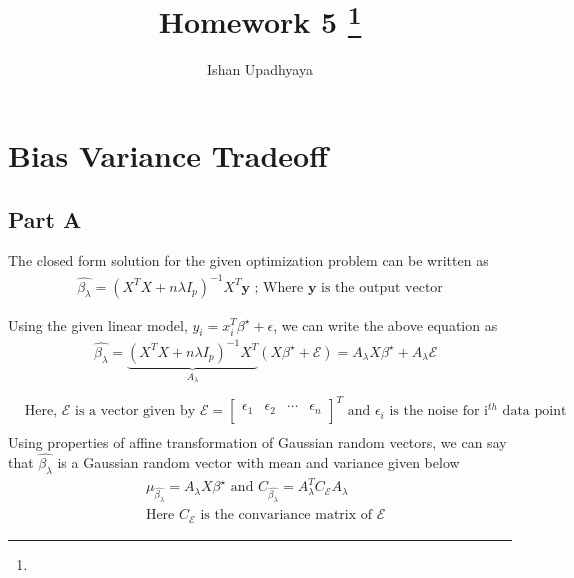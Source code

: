 \documentclass[11pt]{article}
\title{Homework 5
\footnote{\s{COMP SCI 260 - Machine Learning Algorithms ; Fall 2015 }
}
}
\author{Ishan Upadhyaya}
\begin{document}
\maketitle



\section{Bias Variance Tradeoff}

\subsection{Part A}

The closed form solution for the given optimization problem can be written as 
\begin{equation*}
	\begin{split}
		\hat{\beta_{\lambda}} = (X^TX+n\lambda I_p)^{-1}X^{T}\boldsymbol{y} \text{  ; Where $\boldsymbol{y}$ is the output vector}
	\end{split}
\end{equation*}

Using the given linear model, $y_i = x_i^T\beta^{\star} + \epsilon$, we can write the above equation as
\begin{equation*}
	\begin{split}
		& \hat{\beta_{\lambda}} = \underbrace{(X^TX+n\lambda I_p)^{-1}X^{T}}_{A_\lambda}(X\beta^{\star}+\mathcal{E}) = A_{\lambda}X\beta^\star + A_\lambda \mathcal{E}\\
	\end{split}
\end{equation*}
\begin{equation*}
	\begin{split}
		& \text{Here, $\mathcal{E}$ is a vector given by } \mathcal{E} = 
		\begin{bmatrix}
			\epsilon_1 & \epsilon_2 & \cdots & \epsilon_n \\
		\end{bmatrix}^T \text{ and $\epsilon_i$ is the noise for i$^{th}$ data point}\\
	\end{split}
\end{equation*}
Using properties of affine transformation of Gaussian random vectors, we can say that $\hat{\beta_{\lambda}}$ is a Gaussian random vector with mean and variance given below
\begin{equation*}
	\begin{split}
	      & \mu_{\hat{\beta_{\lambda}}} = A_{\lambda}X\beta^\star \text{ and }C_{\hat{\beta_{\lambda}}} = A_{\lambda}^TC_{\mathcal{E}}A_{\lambda} \\
	      & \text{Here $C_{\mathcal{E}}$ is the convariance matrix of $\mathcal{E}$}
	\end{split}
\end{equation*}
\end{document}
